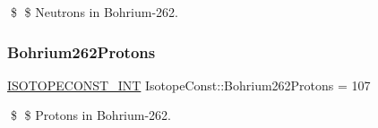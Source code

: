 \$ \$ Neutrons in Bohrium-\/262. \mbox{\label{group___isotope_const-_bohrium-_bh262_ga5b453283e63d75d954c89ab1c3364646}} 
\subsubsection{\texorpdfstring{Bohrium262\+Protons}{Bohrium262Protons}}
{\footnotesize\ttfamily \mbox{\hyperlink{group___isotope_const-_macros_ga5f18360b3e99483a35c32d789e62621c}{I\+S\+O\+T\+O\+P\+E\+C\+O\+N\+S\+T\+\_\+\+I\+NT}} Isotope\+Const\+::\+Bohrium262\+Protons = 107}

\$ \$ Protons in Bohrium-\/262. 